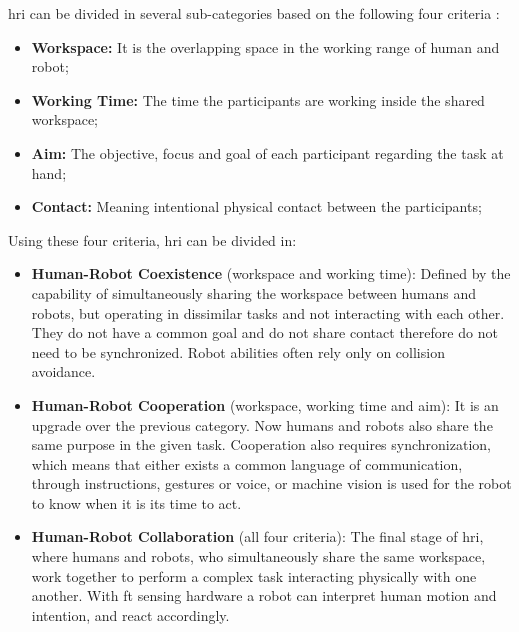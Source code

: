 
\noindent \ac{hri} can be divided in several sub-categories based on the following four criteria \cite{paper.review.1, paper.review.2}:

\begin{itemize}
    \item \textbf{Workspace: }It is the overlapping space in the working range of human and robot;
    \item \textbf{Working Time: }The time the participants are working inside the shared workspace;
    \item \textbf{Aim: }The objective, focus and goal of each participant regarding the task at hand;
    \item \textbf{Contact: }Meaning intentional physical contact between the participants;
\end{itemize}

\noindent Using these four criteria, \ac{hri} can be divided in:

\begin{itemize}
    \item \textbf{Human-Robot Coexistence} (workspace and working time): Defined by the capability of simultaneously sharing the workspace between humans and robots, but operating in dissimilar tasks and not interacting with each other. They do not have a common goal and do not share contact therefore do not need to be synchronized. Robot abilities often rely only on collision avoidance.
    \item \textbf{Human-Robot Cooperation} (workspace, working time and aim): It is an upgrade over the previous category. Now humans and robots also share the same purpose in the given task. Cooperation also requires synchronization, which means that either exists a common language of communication, through instructions, gestures or voice, or machine vision is used for the robot to know when it is its time to act.
    \item \textbf{Human-Robot Collaboration} (all four criteria): The final stage of \ac{hri}, where humans and robots, who simultaneously share the same workspace, work together to perform a complex task interacting physically with one another. With \ac{ft} sensing hardware a robot can interpret human motion and intention, and react accordingly. 
\end{itemize}

